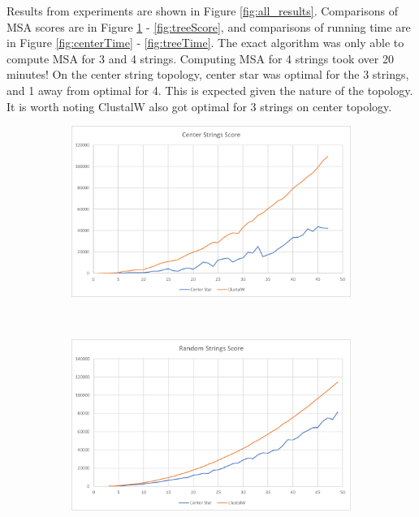 \documentclass[11pt]{article}
\begin{document}
Results from experiments are shown in Figure \ref{fig:all_results}.
Comparisons of MSA scores are in Figure \ref{fig:centerScore} - \ref{fig:treeScore},
and comparisons of running time are in Figure \ref{fig:centerTime} - \ref{fig:treeTime}.
The exact algorithm was only able to compute MSA for 3 and 4 strings.
Computing MSA for 4 strings took over 20 minutes!
On the center string topology, center star was optimal for the 3 strings, and 1 away from optimal for 4.
This is expected given the nature of the topology. It is worth noting ClustalW also got optimal for 3 strings on center topology.

\begin{figure}
    \centering

    \begin{subfigure}[b]{0.49 \textwidth}
        \centering
        \includegraphics[width=\textwidth]{image001.png}
        \caption{}
        \label{fig:centerScore}
    \end{subfigure}
    ~
    \begin{subfigure}[b]{0.49 \textwidth}
        \centering
        \includegraphics[width=\textwidth]{image003.png}

\end{subfigure}
\end{figure}
\end{document}
